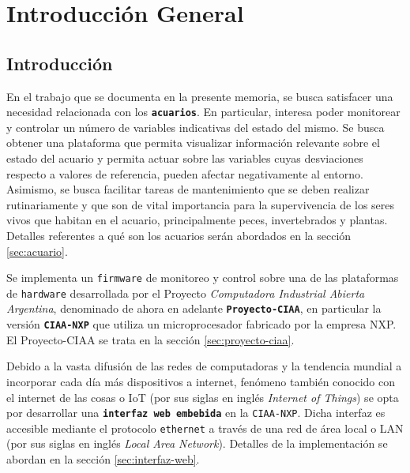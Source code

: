 
\chapter{Introducción General} %

\label{Chapter1} %
\label{IntroGeneral}


\newcommand{\keyword}[1]{\textbf{#1}}
\newcommand{\tabhead}[1]{\textbf{#1}}
\newcommand{\code}[1]{\texttt{#1}}
\newcommand{\file}[1]{\texttt{\bfseries#1}}
\newcommand{\option}[1]{\texttt{\itshape#1}}


\section{Introducción}

En el trabajo que se documenta en la presente memoria, se busca satisfacer una necesidad relacionada con los \textbf{\texttt{acuarios}}. En particular, interesa poder monitorear y controlar un número de variables indicativas del estado del mismo.  Se busca obtener una plataforma que permita visualizar información relevante sobre el estado del acuario y permita actuar sobre las variables cuyas desviaciones respecto a valores de referencia, pueden afectar negativamente al entorno.  Asimismo, se busca facilitar tareas de mantenimiento que se deben realizar rutinariamente y que son de vital importancia para la supervivencia de los seres vivos que habitan en el acuario, principalmente peces, invertebrados y plantas. Detalles referentes a qué son los acuarios serán abordados en la sección \ref{sec:acuario}.

Se implementa un \texttt{firmware} de monitoreo y control sobre una de las plataformas de \texttt{hardware} desarrollada por el Proyecto \textit{Computadora Industrial Abierta Argentina}, denominado de ahora en adelante \textbf{\texttt{Proyecto-CIAA}}, en particular la versión \textbf{\texttt{CIAA-NXP}} que utiliza un microprocesador fabricado por la empresa NXP. El Proyecto-CIAA se trata en la sección \ref{sec:proyecto-ciaa}.

Debido a la vasta difusión de las redes de computadoras y la tendencia mundial a incorporar cada día más dispositivos a internet, fenómeno también conocido con el internet de las cosas o IoT (por sus siglas en inglés \textit{Internet of Things}) se opta por desarrollar una \textbf{\texttt{interfaz web embebida}} en la \texttt{CIAA-NXP}.  Dicha interfaz es accesible mediante el protocolo \texttt{ethernet} a través de una red de área local o LAN (por sus siglas en inglés \textit{Local Area Network}). Detalles de la implementación se abordan en la sección \ref{sec:interfaz-web}.




